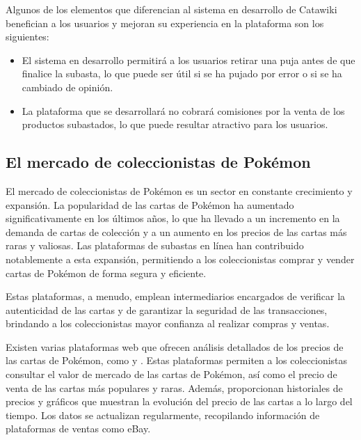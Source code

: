 Algunos de los elementos que diferencian al sistema en desarrollo de Catawiki benefician a los usuarios y mejoran su experiencia en la plataforma son los siguientes:
\begin{itemize}
    \item El sistema en desarrollo permitirá a los usuarios retirar una puja antes de que finalice la subasta, lo que puede ser útil si se ha pujado por error o si se ha cambiado de opinión.
    \item La plataforma que se desarrollará no cobrará comisiones por la venta de los productos subastados, lo que puede resultar atractivo para los usuarios. 
\end{itemize}



\subsection{El mercado de coleccionistas de Pokémon}

El mercado de coleccionistas de Pokémon es un sector en constante crecimiento y expansión. La popularidad de las cartas de Pokémon ha aumentado significativamente en los últimos años, 
lo que ha llevado a un incremento en la demanda de cartas de colección y a un aumento en los precios de las cartas más raras y valiosas. Las plataformas de subastas en línea han contribuido 
notablemente a esta expansión, permitiendo a los coleccionistas comprar y vender cartas de Pokémon de forma segura y eficiente. 

Estas plataformas, a menudo, emplean intermediarios encargados de verificar la autenticidad de las cartas y de garantizar la seguridad de las transacciones, 
brindando a los coleccionistas mayor confianza al realizar compras y ventas.

Existen varias plataformas web que ofrecen análisis detallados de los precios de las cartas de Pokémon, como  y . 
Estas plataformas permiten a los coleccionistas consultar el valor de mercado de las cartas de Pokémon, así como el precio de venta de las cartas más populares y raras. 
Además, proporcionan historiales de precios y gráficos que muestran la evolución del precio de las cartas a lo largo del tiempo. 
Los datos se actualizan regularmente, recopilando información de plataformas de ventas como eBay.


